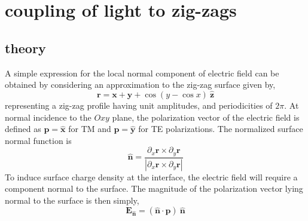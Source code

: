 \documentclass[oneside,11pt,book]{book}
\begin{document}
\section{coupling of light to zig-zags}
\subsection{theory}
A simple expression for the local normal component of electric field can be obtained by considering an approximation to the zig-zag surface given by,
\begin{equation}
\mathbf{r}=\mathbf{x}+\mathbf{y}+\cos{(y-\cos{x})\:\mathbf{\hat{z}}}
\end{equation}
representing a zig-zag profile having unit amplitudes, and periodicities of $2\pi$. At normal incidence to the $Oxy$ plane, the polarization vector of the electric field is defined as $\mathbf{p}=\mathbf{\hat{x}}$ for TM and $\mathbf{p}=\mathbf{\hat{y}}$ for TE polarizations. The normalized surface normal function is
\begin{equation}
\mathbf{\hat{n}}=\frac{\partial_x\mathbf{r}\times\partial_y\mathbf{r}}{|\partial_x\mathbf{r}\times\partial_y\mathbf{r}|}
\end{equation}
To induce surface charge density at the interface, the electric field will require a component normal to the surface. The magnitude of the polarization vector lying normal to the surface is then simply,
\begin{equation}
\mathbf{E}_{\mathbf{\hat{n}}}=(\mathbf{\hat{n}}\cdot\mathbf{p})\:\mathbf{\hat{n}}
\end{equation}
\end{document}
